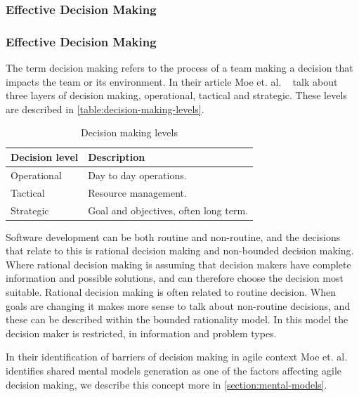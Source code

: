 \subsubsection{Effective Decision Making}

\subsubsection{Effective Decision Making}
The term decision making refers to the process of a team making a decision that impacts the team or its environment. In their article Moe et. al. ~\cite{Moe2011} talk about three layers of decision making, operational, tactical and strategic. These levels are described in \autoref{table:decision-making-levels}. 

\begin{table}[h]
	\begin{center}
		\caption{Decision making levels}
		\label{table:decision-making-levels}
		\begin{tabular}{l l}
			\hline
			Decision level & Description \\
			\hline
			Operational & Day to day operations. \\
			Tactical & Resource management.\\
			Strategic & Goal and objectives, often long term. \\
			\hline
		\end{tabular}
	\end{center}
\end{table}

Software development can be both routine and non-routine, and the decisions that relate to this is rational decision making and non-bounded decision making. Where rational decision making is assuming that decision makers have complete information and possible solutions, and can therefore choose the decision most suitable. Rational decision making is often related to routine decision. When goals are changing it makes more sense to talk about non-routine decisions, and these can be described within the bounded rationality model. In this model the decision maker is restricted, in information and problem types. 

In their identification of barriers of decision making in agile context Moe et. al. identifies shared mental models generation as one of the factors affecting agile decision making, we describe this concept more in \autoref{section:mental-models}. 

